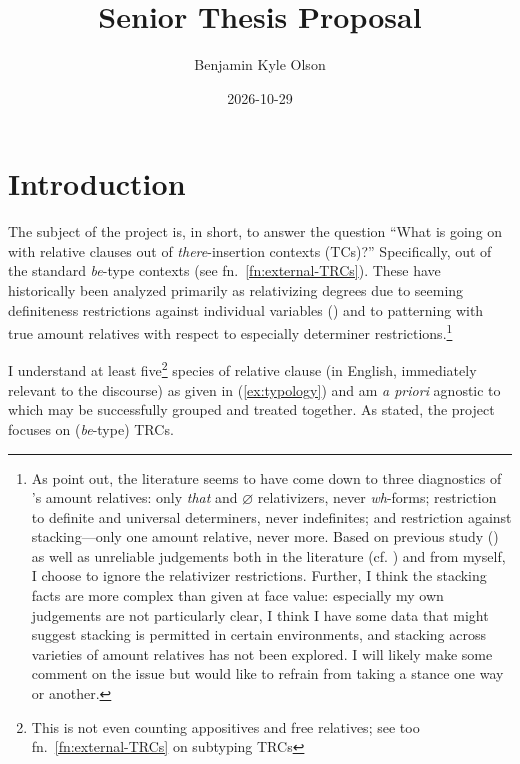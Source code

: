 \documentclass[11pt]{article}
\title{Senior Thesis Proposal}
\author{Benjamin Kyle Olson}
\date{2026-10-29}
\begin{document}
\maketitle

\section{Introduction}
The subject of the project is, in short, to answer the question ``What is going on with relative clauses out of \textit{there}-insertion contexts (TCs)?'' Specifically, out of the standard \textit{be}-type contexts (see fn.~\ref{fn:external-TRCs}). These have historically been analyzed primarily as relativizing degrees due to seeming definiteness restrictions against individual variables (\cite{heimWhereDoesDefiniteness1987}) and to patterning with true amount relatives with respect to especially determiner restrictions.\footnote{\label{fn:restrictions}As \citet{grosuAmountRelatives2017} point out, the literature seems to have come down to three diagnostics of \citet{carlsonAmountRelatives1977}'s amount relatives: only \textit{that} and \(\varnothing\) relativizers, never \textit{wh}-forms; restriction to definite and universal determiners, never indefinites; and restriction against stacking---only one amount relative, never more. Based on previous study (\cite{kayThatVsWhich}) as well as unreliable judgements both in the literature (cf. \cite{heimWhereDoesDefiniteness1987}) and from myself, I choose to ignore the relativizer restrictions. Further, I think the stacking facts are more complex than given at face value: especially my own judgements are not particularly clear, I think I have some data that might suggest stacking is permitted in certain environments, and stacking across varieties of amount relatives has not been explored. I will likely make some comment on the issue but would like to refrain from taking a stance one way or another.}

I understand at least five\footnote{This is not even counting appositives and free relatives; see too fn.~\ref{fn:external-TRCs} on subtyping TRCs} species of relative clause (in English, immediately relevant to the discourse) as given in (\ref{ex:typology}) and am \textit{a priori} agnostic to which may be successfully grouped and treated together. As stated, the project focuses on (\textit{be}-type) TRCs.
\end{document}
